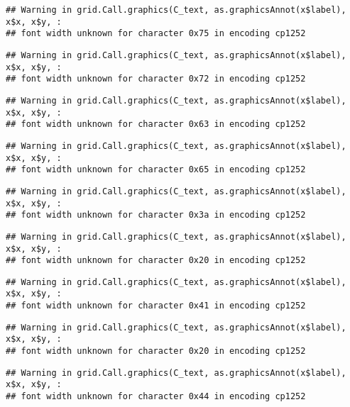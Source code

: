 \documentclass[
]{article}
\begin{document}
\begin{verbatim}
## Warning in grid.Call.graphics(C_text, as.graphicsAnnot(x$label), x$x, x$y, :
## font width unknown for character 0x75 in encoding cp1252
\end{verbatim}

\begin{verbatim}
## Warning in grid.Call.graphics(C_text, as.graphicsAnnot(x$label), x$x, x$y, :
## font width unknown for character 0x72 in encoding cp1252
\end{verbatim}

\begin{verbatim}
## Warning in grid.Call.graphics(C_text, as.graphicsAnnot(x$label), x$x, x$y, :
## font width unknown for character 0x63 in encoding cp1252
\end{verbatim}

\begin{verbatim}
## Warning in grid.Call.graphics(C_text, as.graphicsAnnot(x$label), x$x, x$y, :
## font width unknown for character 0x65 in encoding cp1252
\end{verbatim}

\begin{verbatim}
## Warning in grid.Call.graphics(C_text, as.graphicsAnnot(x$label), x$x, x$y, :
## font width unknown for character 0x3a in encoding cp1252
\end{verbatim}

\begin{verbatim}
## Warning in grid.Call.graphics(C_text, as.graphicsAnnot(x$label), x$x, x$y, :
## font width unknown for character 0x20 in encoding cp1252
\end{verbatim}

\begin{verbatim}
## Warning in grid.Call.graphics(C_text, as.graphicsAnnot(x$label), x$x, x$y, :
## font width unknown for character 0x41 in encoding cp1252
\end{verbatim}

\begin{verbatim}
## Warning in grid.Call.graphics(C_text, as.graphicsAnnot(x$label), x$x, x$y, :
## font width unknown for character 0x20 in encoding cp1252
\end{verbatim}

\begin{verbatim}
## Warning in grid.Call.graphics(C_text, as.graphicsAnnot(x$label), x$x, x$y, :
## font width unknown for character 0x44 in encoding cp1252
\end{verbatim}
\end{document}
